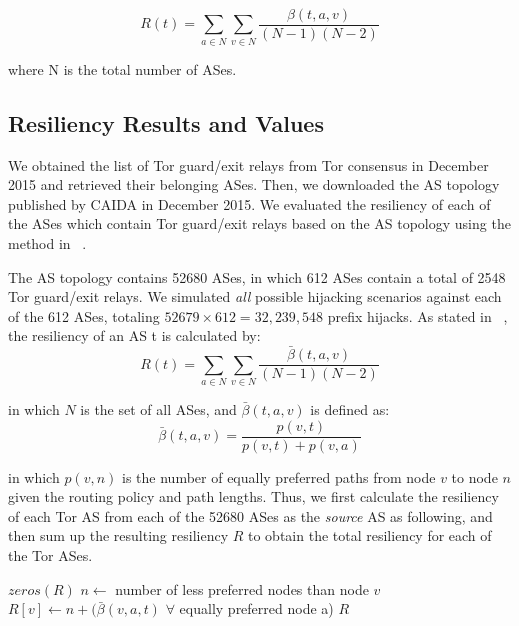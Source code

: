 \[R(t) = \sum_{a \in N} \sum_{v \in N} \frac{\beta(t,a,v)}{(N-1)(N-2)}\]

where N is the total number of ASes.



\subsection{Resiliency Results and Values}

We obtained the list of Tor guard/exit relays from Tor consensus in December 2015 and retrieved their belonging ASes. Then, we downloaded the AS topology published by CAIDA in December 2015. We evaluated the resiliency of each of the ASes which contain Tor guard/exit relays based on the AS topology using the method in ~\cite{lad2007understanding}. 

The AS topology contains 52680 ASes, in which 612 ASes contain a total of 2548 Tor guard/exit relays. We simulated \emph{all} possible hijacking scenarios against each of the 612 ASes, totaling $52679 \times 612 = 32,239,548$ prefix hijacks. As stated in ~\cite{lad2007understanding}, the resiliency of an AS t is calculated by:
\begin{equation}
R(t) = \sum_{a \in N} \sum_{v \in N} \frac {\bar{\beta}(t,a,v)} {(N-1)(N-2)}
\end{equation}

in which $N$ is the set of all ASes, and $\bar{\beta}(t,a,v)$ is defined as:
\begin{equation}
\bar{\beta}(t,a,v) = \frac {p(v,t)} {p(v,t) + p(v,a)}
\end{equation}

in which $p(v,n)$ is the number of equally preferred paths from node $v$ to node $n$ given the routing policy and path lengths. Thus, we first calculate the resiliency of each Tor AS from each of the 52680 ASes as the \emph{source} AS as following, and then sum up the resulting resiliency $R$ to obtain the total resiliency for each of the Tor ASes. 
\\
\begin{algorithmic}
    \State {}
    \State $zeros(R)$
		\State $n \gets $ number of less preferred nodes than node $v$
		\State $R[v] \gets n + (\bar{\beta}(v,a,t)$ $\forall$ equally preferred node a)
	\EndIf
    \EndFor
    \State \Return $R$
\EndFunction
\end{algorithmic}

